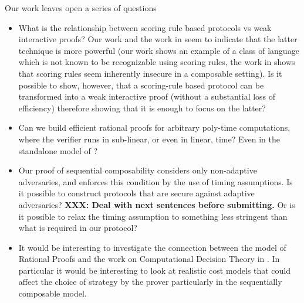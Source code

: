 \documentclass{llncs}
\begin{document}
Our work leaves open a series of questions
\begin{itemize}
\item What is the relationship between scoring rule based protocols vs weak interactive proofs? Our work and the work in \cite{cg15} seem to indicate that the latter technique is more powerful (our work shows an example of a class of language which is not known to be recognizable using scoring rules, the work in \cite{cg15} shows that scoring rules seem inherently insecure in a composable setting). Is it possible to show, however, that a scoring-rule based protocol can be transformed into a weak interactive proof (without a substantial loss of efficiency) therefore showing that it is enough to focus on the latter?

\item Can we build efficient rational proofs for arbitrary poly-time computations, where the verifier runs in sub-linear, or even in linear, time? Even in the standalone model of \cite{am}?

\item Our proof of sequential composability considers only non-adaptive adversaries, and enforces this condition by the use of timing assumptions. Is it possible to construct protocols that are secure against adaptive adversaries? \textbf{XXX: Deal with next sentences before submitting.} Or is it possible to relax the timing assumption to something less stringent than what is required in our protocol?

\item It would be interesting to investigate the connection between the model of Rational Proofs and the work on Computational Decision Theory in  \cite{halpern2011don}. In particular it would be interesting to look at realistic cost models that could affect the choice of strategy by the prover particularly in the sequentially composable model. 
\end{itemize}




    


\end{document}
